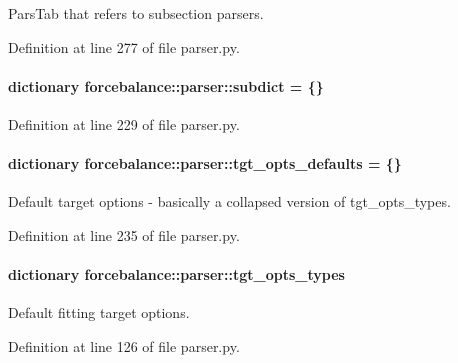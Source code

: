 \-Pars\-Tab that refers to subsection parsers. 



\-Definition at line 277 of file parser.\-py.

\hypertarget{namespaceforcebalance_1_1parser_abb7a7e9723de629aa97727a85bcdbad1}{
\paragraph[{subdict}]{\setlength{\rightskip}{0pt plus 5cm}dictionary {\bf forcebalance\-::parser\-::subdict} = \{\}}}\label{namespaceforcebalance_1_1parser_abb7a7e9723de629aa97727a85bcdbad1}


\-Definition at line 229 of file parser.\-py.

\hypertarget{namespaceforcebalance_1_1parser_ad2c80e2b742fbd9594fd813dd51550e6}{
\paragraph[{tgt\-\_\-opts\-\_\-defaults}]{\setlength{\rightskip}{0pt plus 5cm}dictionary {\bf forcebalance\-::parser\-::tgt\-\_\-opts\-\_\-defaults} = \{\}}}\label{namespaceforcebalance_1_1parser_ad2c80e2b742fbd9594fd813dd51550e6}


\-Default target options -\/ basically a collapsed version of tgt\-\_\-opts\-\_\-types. 



\-Definition at line 235 of file parser.\-py.

\hypertarget{namespaceforcebalance_1_1parser_a1725a6ea3c588046339f9476f3e3f32e}{
\paragraph[{tgt\-\_\-opts\-\_\-types}]{\setlength{\rightskip}{0pt plus 5cm}dictionary {\bf forcebalance\-::parser\-::tgt\-\_\-opts\-\_\-types}}}\label{namespaceforcebalance_1_1parser_a1725a6ea3c588046339f9476f3e3f32e}


\-Default fitting target options. 



\-Definition at line 126 of file parser.\-py.

